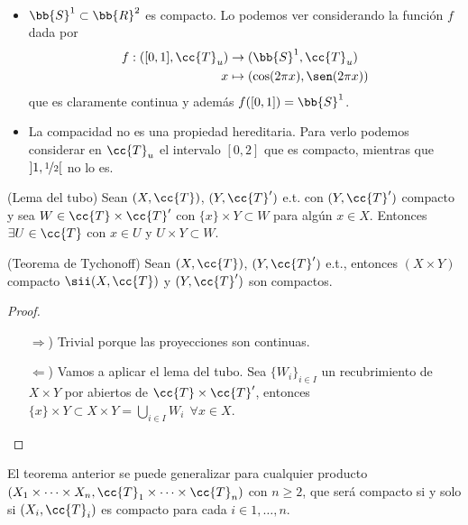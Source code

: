 \begin{ejemplo}\
    \begin{itemize}
        \item $\bb{S}^1\subset \bb{R}^2$ es compacto. Lo podemos ver considerando la función $f$ dada por 
        \begin{align*}
            f:([0,1], \cc{T}_u)&\to (\bb{S}^1, \cc{T}_u)\\
            x&\mapsto (\cos(2\pi x), \sen(2\pi x))
        \end{align*}
        que es claramente continua y además $f([0,1])=\bb{S}^1$.
        \item La compacidad no es una propiedad hereditaria. Para verlo podemos considerar en $\cc{T}_u$ el intervalo $[0,2]$ que es compacto, mientras que $]1,\nicefrac{1}{2}[$ no lo es.
    \end{itemize}
    \endsquare
\end{ejemplo}

\begin{lema}
    (Lema del tubo) Sean $(X, \cc{T})$, $(Y, \cc{T}')$ e.t. con $(Y, \cc{T}')$ compacto y sea $W\in \cc{T}\times \cc{T}'$ con $\{x\}\times Y \subset W$ para algún $x\in X$. Entonces $\exists U\in \cc{T}$ con $x\in U$ y $U\times Y \subset W$.
    \endsquare
\end{lema}

\begin{teo}
    (Teorema de Tychonoff) Sean $(X, \cc{T})$, $(Y, \cc{T}')$ e.t., entonces $(X\times Y)$ compacto $\sii (X, \cc{T})$ y $(Y, \cc{T}')$ son compactos.
    \begin{proof}\
        \begin{itemize}
            \item[$\Rightarrow$)] Trivial porque las proyecciones son continuas.
            \item[$\Leftarrow$)] Vamos a aplicar el lema del tubo. Sea $\{W_i\}_{i\in I}$ un recubrimiento de $X\times Y$ por abiertos de $\cc{T}\times \cc{T}'$, entonces $\{x\}\times Y \subset X\times Y = \bigcup\limits_{i\in I}W_i\ \ \forall x \in X$. 
        \end{itemize}
    \end{proof}
\end{teo}

\begin{coro}
    El teorema anterior se puede generalizar para cualquier producto $(X_1\times \dots\times X_n, \cc{T}_1\times \dots\times \cc{T}_n)$ con $n\geq 2$, que será compacto si y solo si $(X_i, \cc{T}_i)$ es compacto para cada $i\in 1,\dots,n$.
    \endsquare
\end{coro}

